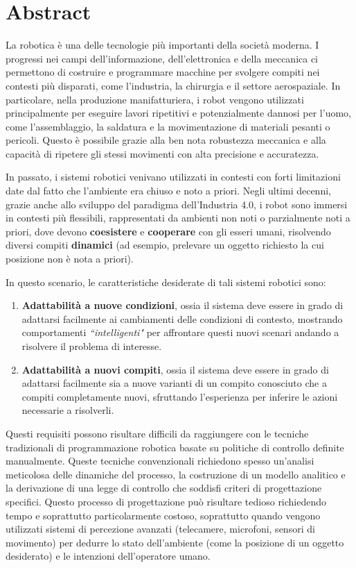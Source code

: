 \chapter*{Abstract}
\label{ch:abstract}
La robotica è una delle tecnologie più importanti della società moderna. I progressi nei campi dell'informazione, dell'elettronica e della meccanica ci permettono di costruire e programmare macchine per svolgere compiti nei contesti più disparati, come l'industria, la chirurgia e il settore aerospaziale.
\newline In particolare, nella produzione manifatturiera, i robot vengono utilizzati principalmente per eseguire lavori ripetitivi e potenzialmente dannosi per l'uomo, come l'assemblaggio, la saldatura e la movimentazione di materiali pesanti o pericoli. Questo è possibile grazie alla ben nota robustezza meccanica e alla capacità di ripetere gli stessi movimenti con alta precisione e accuratezza.

In passato, i sistemi robotici venivano utilizzati in contesti con forti limitazioni date dal fatto che l'ambiente era chiuso e noto a priori. Negli ultimi decenni, grazie anche allo sviluppo del paradigma dell'Industria 4.0, i robot sono immersi in contesti più flessibili, rappresentati da ambienti non noti o parzialmente noti a priori, dove devono \textbf{coesistere} e \textbf{cooperare} con gli esseri umani, risolvendo diversi compiti \textbf{dinamici} \cite{bini2023multi} (ad esempio, prelevare un oggetto richiesto la cui posizione non è nota a priori).

In questo scenario, le caratteristiche desiderate di tali sistemi robotici sono:
\begin{enumerate}[label=\textbf{(\alph*)}]
\item \textbf{Adattabilità a nuove condizioni}, ossia il sistema deve essere in grado di adattarsi facilmente ai cambiamenti delle condizioni di contesto, mostrando comportamenti \textit{``intelligenti"} per affrontare questi nuovi scenari andando a risolvere il problema di interesse.
\item \textbf{Adattabilità a nuovi compiti}, ossia il sistema deve essere in grado di adattarsi facilmente sia a nuove varianti di un compito conosciuto che a compiti completamente nuovi, sfruttando l'esperienza per inferire le azioni necessarie a risolverli.
\end{enumerate}

Questi requisiti possono risultare difficili da raggiungere con le tecniche tradizionali di programmazione robotica basate su politiche di controllo definite manualmente. Queste tecniche convenzionali richiedono spesso un'analisi meticolosa delle dinamiche del processo, la costruzione di un modello analitico e la derivazione di una legge di controllo che soddisfi criteri di progettazione specifici. Questo processo di progettazione può risultare tedioso richiedendo tempo e soprattutto particolarmente costoso, soprattutto quando vengono utilizzati sistemi di percezione avanzati (telecamere, microfoni, sensori di movimento) per dedurre lo stato dell'ambiente (come la posizione di un oggetto desiderato) e le intenzioni dell'operatore umano.

